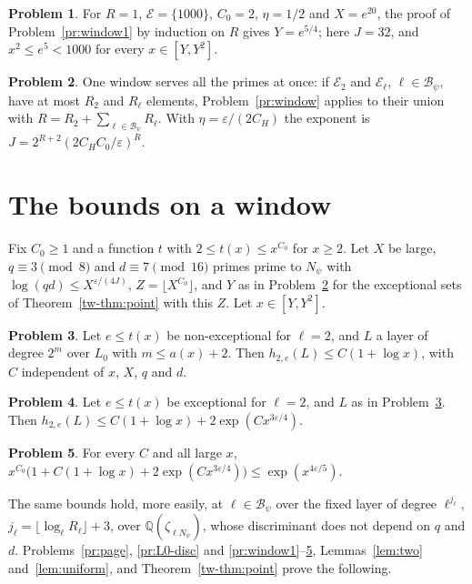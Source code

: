 \documentclass[reqno]{amsart}
\theoremstyle{definition}
\newtheorem{problem}{Problem}[section]
\theoremstyle{plain}
\theoremstyle{remark}
\newcommand{\Q}{\mathbb{Q}}
\newcommand{\Bc}{\mathcal{B}}
\newcommand{\Ec}{\mathcal{E}}
\begin{document}
\begin{problem}\label{pr:window-example}
For \(R=1\), \(\Ec=\{1000\}\), \(C_0=2\), \(\eta=1/2\) and \(X=e^{20}\), the proof of Problem~\ref{pr:window1} by induction on \(R\) gives \(Y=e^{5/4}\); here \(J=32\), and \(x^2\le e^5<1000\) for every \(x\in[Y,Y^2]\).
\end{problem}

\begin{problem}\label{pr:union}
One window serves all the primes at once: if \(\Ec_2\) and \(\Ec_\ell\), \(\ell\in\Bc_\psi\), have at most \(R_2\) and \(R_\ell\) elements, Problem~\ref{pr:window} applies to their union with \(R=R_2+\sum_{\ell\in\Bc_\psi}R_\ell\).  With \(\eta=\varepsilon/(2C_H)\) the exponent is \(J=2^{R+2}(2C_HC_0/\varepsilon)^R\).
\end{problem}

\section{The bounds on a window}\label{sec:bounds}

Fix \(C_0\ge1\) and a function \(t\) with \(2\le t(x)\le x^{C_0}\) for \(x\ge2\).  Let \(X\) be large, \(q\equiv3\pmod8\) and \(d\equiv7\pmod{16}\) primes prime to \(N_\psi\) with \(\log(qd)\le X^{\varepsilon/(4J)}\), \(Z=\lfloor X^{C_0}\rfloor\), and \(Y\) as in Problem~\ref{pr:union} for the exceptional sets of Theorem~\ref{tw-thm:point} with this \(Z\).  Let \(x\in[Y,Y^2]\).

\begin{problem}\label{pr:nonexc}
Let \(e\le t(x)\) be non-exceptional for \(\ell=2\), and \(L\) a layer of degree \(2^m\) over \(L_0\) with \(m\le a(x)+2\).  Then \(h_{2,e}(L)\le C(1+\log x)\), with \(C\) independent of \(x\), \(X\), \(q\) and \(d\).
\end{problem}

\begin{problem}\label{pr:exc}
Let \(e\le t(x)\) be exceptional for \(\ell=2\), and \(L\) as in Problem~\ref{pr:nonexc}.  Then \(h_{2,e}(L)\le C(1+\log x)+2\exp(Cx^{3\varepsilon/4})\).
\end{problem}

\begin{problem}\label{pr:final}
For every \(C\) and all large \(x\), \(x^{C_0}\bigl(1+C(1+\log x)+2\exp(Cx^{3\varepsilon/4})\bigr)\le\exp(x^{4\varepsilon/5})\).
\end{problem}

The same bounds hold, more easily, at \(\ell\in\Bc_\psi\) over the fixed layer of degree \(\ell^{j_\ell}\), \(j_\ell=\lfloor\log_\ell R_\ell\rfloor+3\), over \(\Q(\zeta_{\ell N_\psi})\), whose discriminant does not depend on \(q\) and \(d\).  Problems~\ref{pr:page}, \ref{pr:L0-disc} and \ref{pr:window1}--\ref{pr:final}, Lemmas~\ref{lem:two} and~\ref{lem:uniform}, and Theorem~\ref{tw-thm:point} prove the following.
\end{document}
